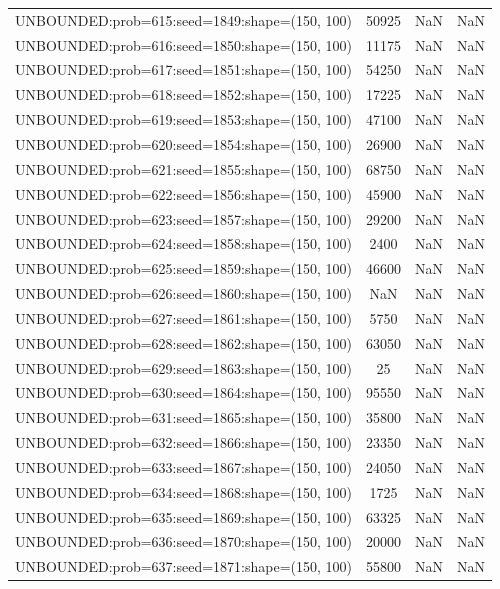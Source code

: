 \begin{longtable}{lccc}
UNBOUNDED:prob=615:seed=1849:shape=(150, 100) & 50925 &   NaN &    NaN \\
UNBOUNDED:prob=616:seed=1850:shape=(150, 100) & 11175 &   NaN &    NaN \\
UNBOUNDED:prob=617:seed=1851:shape=(150, 100) & 54250 &   NaN &    NaN \\
UNBOUNDED:prob=618:seed=1852:shape=(150, 100) & 17225 &   NaN &    NaN \\
UNBOUNDED:prob=619:seed=1853:shape=(150, 100) & 47100 &   NaN &    NaN \\
UNBOUNDED:prob=620:seed=1854:shape=(150, 100) & 26900 &   NaN &    NaN \\
UNBOUNDED:prob=621:seed=1855:shape=(150, 100) & 68750 &   NaN &    NaN \\
UNBOUNDED:prob=622:seed=1856:shape=(150, 100) & 45900 &   NaN &    NaN \\
UNBOUNDED:prob=623:seed=1857:shape=(150, 100) & 29200 &   NaN &    NaN \\
UNBOUNDED:prob=624:seed=1858:shape=(150, 100) &  2400 &   NaN &    NaN \\
UNBOUNDED:prob=625:seed=1859:shape=(150, 100) & 46600 &   NaN &    NaN \\
UNBOUNDED:prob=626:seed=1860:shape=(150, 100) &   NaN &   NaN &    NaN \\
UNBOUNDED:prob=627:seed=1861:shape=(150, 100) &  5750 &   NaN &    NaN \\
UNBOUNDED:prob=628:seed=1862:shape=(150, 100) & 63050 &   NaN &    NaN \\
UNBOUNDED:prob=629:seed=1863:shape=(150, 100) &    25 &   NaN &    NaN \\
UNBOUNDED:prob=630:seed=1864:shape=(150, 100) & 95550 &   NaN &    NaN \\
UNBOUNDED:prob=631:seed=1865:shape=(150, 100) & 35800 &   NaN &    NaN \\
UNBOUNDED:prob=632:seed=1866:shape=(150, 100) & 23350 &   NaN &    NaN \\
UNBOUNDED:prob=633:seed=1867:shape=(150, 100) & 24050 &   NaN &    NaN \\
UNBOUNDED:prob=634:seed=1868:shape=(150, 100) &  1725 &   NaN &    NaN \\
UNBOUNDED:prob=635:seed=1869:shape=(150, 100) & 63325 &   NaN &    NaN \\
UNBOUNDED:prob=636:seed=1870:shape=(150, 100) & 20000 &   NaN &    NaN \\
UNBOUNDED:prob=637:seed=1871:shape=(150, 100) & 55800 &   NaN &    NaN \\

\end{longtable}
